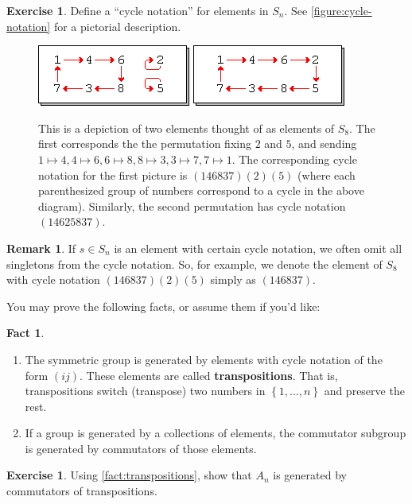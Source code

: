 \documentclass[reqno, 12pt, letter]{article}
\theoremstyle{plain}
\theoremstyle{definition}
\newtheorem{remark}[theorem]{Remark}
\newtheorem{exercise}[theorem]{Exercise}
\newtheorem{fact}[theorem]{Fact}
\theoremstyle{remark}
\numberwithin{equation}{section}
\begin{document}
\begin{exercise}
	\label{exercise:}
	Define a ``cycle notation'' for elements in $S_n$. See \autoref{figure:cycle-notation} for a pictorial description.
	\begin{figure}[h!]
		\includegraphics[scale=1.5]{cycle-1.png}
		\includegraphics[scale=1.5]{cycle-2.png}
		\caption{This is a depiction of two elements thought of as elements of $S_8$. The first corresponds the the permutation fixing $2$ and $5$,
			and sending $1 \mapsto 4, 4 \mapsto 6, 6 \mapsto 8, 8\mapsto 3, 3 \mapsto 7, 7\mapsto 1$.
			The corresponding cycle notation for the first picture is $(146837)(2)(5)$ (where each parenthesized group of numbers
			correspond to a cycle in the above diagram). Similarly, the second permutation has cycle notation $(14625837)$.}

		\label{figure:cycle-notation}\end{figure}
\end{exercise}
\begin{remark}
	\label{remark:}
	If $s \in S_n$ is an element with certain cycle notation, we often omit all singletons from the cycle notation.
	So, for example, we denote the element of $S_8$ with cycle notation $(146837)(2)(5)$ simply as $(146837)$.
\end{remark}

You may prove the following facts, or assume them if you'd like:
\begin{fact}
	\label{fact:transpositions}
	\begin{enumerate}
		\item The symmetric group is generated by elements with cycle notation of the form $(ij)$. These elements are called {\bf transpositions}. That is, transpositions switch (transpose) two numbers in $\left\{ 1, \ldots, n \right\}$ and preserve the rest.
		\item If a group is generated by a collections of elements, the commutator subgroup is generated by commutators of those elements.
	\end{enumerate}
\end{fact}
\begin{exercise}
	\label{exercise:commutators-generate}
	Using \autoref{fact:transpositions}, show that $A_n$ is generated by commutators of transpositions.
\end{exercise}
\end{document}
